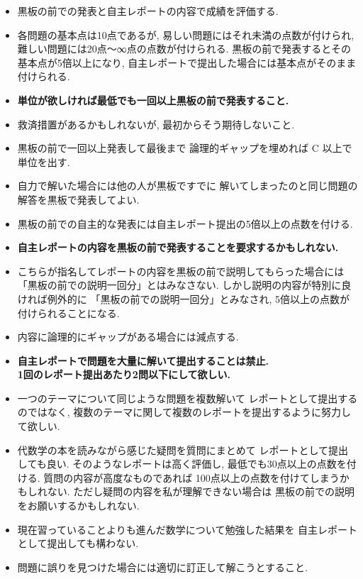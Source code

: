 \documentclass[12pt,twoside]{jarticle}
\begin{document}
{\small
\begin{itemize}
 \item 黒板の前での発表と自主レポートの内容で成績を評価する.
 \item 各問題の基本点は10点であるが, 
       易しい問題にはそれ未満の点数が付けられ, 
       難しい問題には20点〜∞点の点数が付けられる.
       黒板の前で発表するとその基本点が5倍以上になり, 
       自主レポートで提出した場合には基本点がそのまま付けられる.
 \item {\bf 単位が欲しければ最低でも一回以上黒板の前で発表すること.}
 \item 救済措置があるかもしれないが, 最初からそう期待しないこと.
 \item 黒板の前で一回以上発表して最後まで
       論理的ギャップを埋めれば C 以上で単位を出す.
 \item 自力で解いた場合には他の人が黒板ですでに
       解いてしまったのと同じ問題の解答を黒板で発表してよい.
 \item 黒板の前での自主的な発表には自主レポート提出の5倍以上の点数を付ける.
 \item {\bf 自主レポートの内容を黒板の前で発表することを要求するかもしれない.}
 \item こちらが指名してレポートの内容を黒板の前で説明してもらった場合には
       「黒板の前での説明一回分」とはみなさない.
       しかし説明の内容が特別に良ければ例外的に
       「黒板の前での説明一回分」とみなされ, 
       5倍以上の点数が付けられることになる.
 \item 内容に論理的にギャップがある場合には減点する.
 \item {\bf 自主レポートで問題を大量に解いて提出することは禁止.\\
       1回のレポート提出あたり2問以下にして欲しい.}
 \item 一つのテーマについて同じような問題を複数解いて
       レポートとして提出するのではなく, 
       複数のテーマに関して複数のレポートを提出するように努力して欲しい.
 \item 代数学の本を読みながら感じた疑問を質問にまとめて
       レポートとして提出しても良い.
       そのようなレポートは高く評価し, 
       最低でも30点以上の点数を付ける.
       質問の内容が高度なものであれば
       100点以上の点数を付けてしまうかもしれない.
       ただし疑問の内容を私が理解できない場合は
       黒板の前での説明をお願いするかもしれない.
 \item 現在習っていることよりも進んだ数学について勉強した結果を
       自主レポートとして提出しても構わない.
 \item 問題に誤りを見つけた場合には適切に訂正して解こうとすること.
\end{itemize}
}
\end{document}
